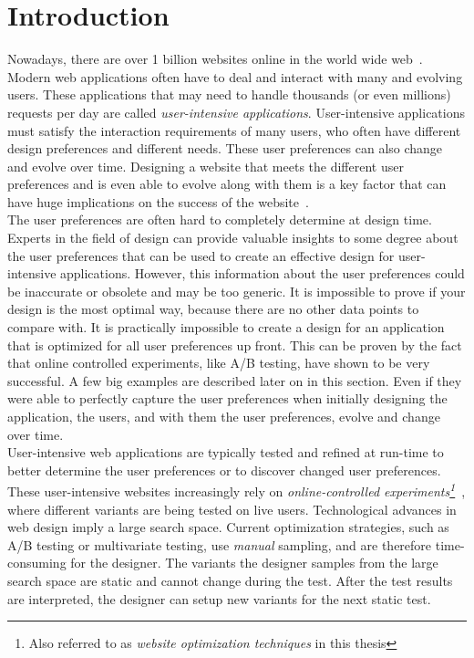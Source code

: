 \documentclass{report}
\begin{document}
\chapter{Introduction}
Nowadays, there are over 1 billion websites online in the world wide web~\cite{numwebsites}. Modern web applications often have to deal and interact with many and evolving users. These applications that may need to handle thousands (or even millions) requests per day are called \textit{user-intensive applications}. User-intensive applications must satisfy the interaction requirements of many users, who often have different design preferences and different needs. These user preferences can also change and evolve over time. Designing a website that meets the different user preferences and is even able to evolve along with them is a key factor that can have huge implications on the success of the website~\cite{abtestwired}.\\

The  user preferences are often hard to completely determine at design time. 
Experts in the field of design can provide valuable insights to some degree about the user preferences that can be used to create an effective design for user-intensive applications. However, this information about the user preferences could be inaccurate or obsolete and may be too generic. It is impossible to prove if your design is the most optimal way, because there are no other data points to compare with. It is practically impossible to create a design for an application that is optimized for all user preferences up front. This can be proven by the fact that online controlled experiments, like A/B testing, have shown to be very successful. A few big examples are described later on in this section. Even if they were able to perfectly capture the user preferences when initially designing the application, the users, and with them the user preferences, evolve and change over time.\\

User-intensive web applications are typically tested and refined at run-time to better determine the user preferences or to discover changed user preferences. These user-intensive websites increasingly rely on \textit{online-controlled experiments\footnote{Also referred to as \textit{website optimization techniques} in this thesis}}~\cite{kohavi2007practical, kohavi2013online}, where different variants are being tested on live users. Technological advances in web design imply a large search space. Current optimization strategies, such as A/B testing or multivariate testing, use \textit{manual} sampling, and are therefore time-consuming for the designer. The variants the designer samples from the large search space are static and cannot change during the test. After the test results are interpreted, the designer can setup new variants for the next static test.\\
\end{document}
